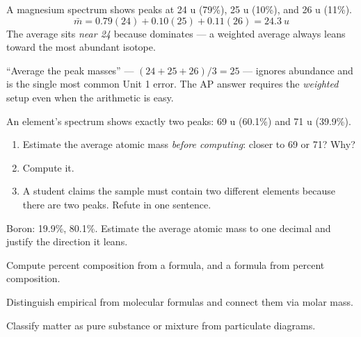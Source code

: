 \documentclass{apchem-notes}
\begin{document}
\begin{workedexample}
A magnesium spectrum shows peaks at 24 u (79\%), 25 u (10\%), and 26 u (11\%).
\[
  \bar{m} = 0.79(24) + 0.10(25) + 0.11(26) = \SI{24.3}{u}
\]
The average sits \emph{near 24} because  dominates --- a weighted
average always leans toward the most abundant isotope.
\end{workedexample}

\begin{apctrap}
``Average the peak masses'' --- $(24+25+26)/3 = 25$ --- ignores abundance and
is the single most common Unit 1 error. The AP answer requires the
\emph{weighted} setup even when the arithmetic is easy.
\end{apctrap}


An element's spectrum shows exactly two peaks: 69 u (60.1\%) and 71 u (39.9\%).

\begin{enumerate}[leftmargin=*,itemsep=0.4em]
  \item Estimate the average atomic mass \emph{before computing}: closer to 69
        or 71? Why?
  \item Compute it. \workspace[2.2cm]
  \item A student claims the sample must contain two different elements
        because there are two peaks. Refute in one sentence.
\end{enumerate}

\begin{exitticket}
Boron:  19.9\%,  80.1\%. Estimate the average atomic
mass to one decimal and justify the direction it leans.
\end{exitticket}


\begin{objectives}
  \item Compute percent composition from a formula, and a formula from
        percent composition.
  \item Distinguish empirical from molecular formulas and connect them via
        molar mass.
  \item Classify matter as pure substance or mixture from particulate
        diagrams.
\end{objectives}
\end{document}
